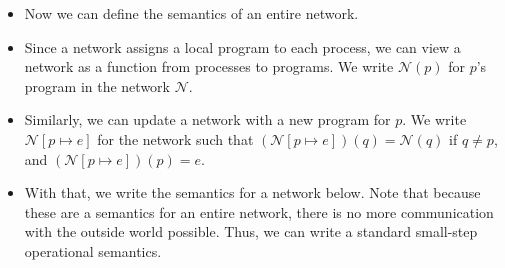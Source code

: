 \documentclass{lecturenotes}
\begin{document}
\begin{itemize}
\item Now we can define the semantics of an entire network.
\item Since a network assigns a local program to each process, we can view a network as a function from processes to programs.
  We write $\mathcal{N}(p)$ for $p$'s program in the network $\mathcal{N}$.
\item Similarly, we can update a network with a new program for $p$.
  We write $\mathcal{N}[p \mapsto e]$ for the network such that $(\mathcal{N}[p \mapsto e])(q) = \mathcal{N}(q)$ if $q \neq p$, and $(\mathcal{N}[p \mapsto e])(p) = e$.
\item With that, we write the semantics for a network below.
  Note that because these are a semantics for an entire network, there is no more communication with the outside world possible.
  Thus, we can write a standard small-step operational semantics.
\end{itemize}

\end{document}
